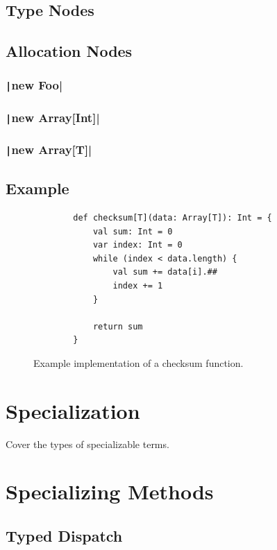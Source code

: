 \subsection{Type Nodes}

\subsection{Allocation Nodes}

\subsubsection{\texttt|new Foo|}

\subsubsection{\texttt|new Array[Int]|}

\subsubsection{\texttt|new Array[T]|}

\subsection{Example}

\begin{figure}[H]
	\begin{verbatim}
		def checksum[T](data: Array[T]): Int = {
			val sum: Int = 0
			var index: Int = 0
			while (index < data.length) {
				val sum += data[i].##
				index += 1
			}
			
			return sum	
		}
	\end{verbatim}
	\caption{Example implementation of a checksum function.}
\end{figure}

\section{Specialization}

Cover the types of specializable terms.

\section{Specializing Methods}

\subsection{Typed Dispatch}

